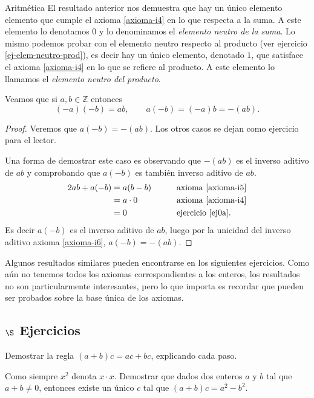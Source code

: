 \begin{section}{Aritmética}
El resultado anterior nos demuestra que hay un único elemento elemento que cumple el axioma \ref{axioma-i4} en lo que respecta a la suma. A este elemento lo denotamos $0$ y lo denominamos el \textit{elemento neutro de la suma}. Lo mismo podemos probar con el elemento neutro respecto al producto (ver ejercicio \ref{ej-elem-neutro-prod}),  es decir hay un único elemento,  denotado $1$, que satisface el axioma \ref{axioma-i4} en lo que se refiere al producto. A  este elemento lo llamamos el \textit{elemento neutro del producto}.  

\begin{proposicion} Veamos que  si $a,b \in \mathbb Z$ entonces
$$
(-a)(-b) = ab ,\qquad a(-b) = (-a)b = -(ab).
$$
\end{proposicion}
\begin{proof}
Veremos que  $a(-b) = -(ab)$. Los otros casos se dejan como ejercicio para el lector.

Una forma de demostrar este caso es  observando que $-(ab)$ es el inverso aditivo de $ab$ y comprobando que $a(-b)$ es también inverso aditivo de $ab$.
\begin{alignat*}2
ab + a(-b) &=a(b-b) &\qquad &\text{axioma \ref{axioma-i5}} \\
&=a\cdot 0 &\qquad &\text{axioma \ref{axioma-i4}}\\
&= 0 &\qquad &\text{ejercicio \ref{ej0a}}.
\end{alignat*}
Es decir $a(-b)$ es el inverso aditivo de $ab$, luego por la unicidad del inverso aditivo axioma \ref{axioma-i6}, $a(-b)=-(ab)$.
\end{proof}


Algunos resultados similares pueden encontrarse en los siguientes ejercicios. Como aún no tenemos todos los axiomas correspondientes a los enteros, los resultados no son particularmente interesantes, pero lo que importa es recordar que pueden ser probados sobre la base única de los axiomas.


\subsection*{$\S$ Ejercicios}

\begin{enumex}

\item Demostrar la regla $(a+b)c=ac+bc$, explicando cada paso.

\item Como siempre $x^2$ denota $x\cdot x$. Demostrar que dados dos enteros $a$ y $b$ tal que $a+b \not=0$, entonces existe un único $c$ tal que $(a+b)c=
a^2 - b^2$.


\end{enumex}
\end{section}
